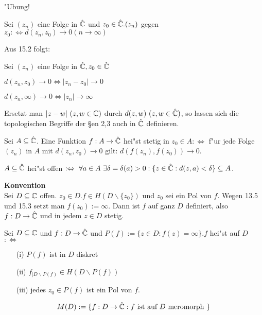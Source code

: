 \documentclass[a4paper,twoside,DIV15,BCOR12mm]{scrbook}
\begin{document}
\begin{beweis}
"Ubung!
\end{beweis}

\begin{definition}
Sei $(z_n)$ eine Folge in $\hat{\mathbb{C}}$ und $z_0 \in \hat{\mathbb{C}}. (z_n)$  gegen $z_0 :\Leftrightarrow d(z_n,z_0) \rightarrow 0 (n \rightarrow \infty)$
\end{definition}

Aus 15.2 folgt:
\begin{satz}
Sei $(z_n)$ eine Folge in $\hat{\mathbb{C}}, z_0 \in \hat{\mathbb{C}}$
\begin{liste}
\item $d(z_n,z_0) \rightarrow 0 \Leftrightarrow |z_n-z_0| \rightarrow 0$
\item $d(z_n,\infty) \rightarrow 0 \Leftrightarrow |z_n| \rightarrow \infty$
\end{liste}
\end{satz}

Ersetzt man $|z-w| \ (z,w \in \mathbb{C})$ durch $d(z,w) \ (z,w \in \hat{\mathbb{C}})$, so lassen sich die topologischen Begriffe der §en 2,3 auch in $\hat{\mathbb{C}}$ definieren.

\begin{beispiele}
\item Sei $A \subseteq \hat{\mathbb{C}}$. Eine Funktion $f: A \rightarrow \hat{\mathbb{C}}$ hei"st stetig in $z_0 \in A :\Leftrightarrow$ f"ur jede Folge $(z_n)$ in $A$ mit $d(z_n,z_0) \rightarrow 0$ gilt: $d(f(z_n),f(z_0)) \rightarrow 0$.
\item $A \subseteq \hat{\mathbb{C}}$ hei"st offen $: \Leftrightarrow \ \forall a \in A \ \exists \delta = \delta(a) > 0: \{ z \in \hat{\MdC}: d(z,a) < \delta \} \subseteq A$.
\end{beispiele}

{\bf Konvention}\\
Sei $D \subseteq \mathbb{C}$ offen. $z_0 \in D. f \in H(D \backslash\{z_0\})$ und $z_0$ sei ein  Pol von $f$. Wegen 13.5 und 15.3 setzt man $f(z_0):=\infty$. Dann ist $f$ auf ganz $D$ definiert, also $f: D \rightarrow \hat{\mathbb{C}}$ und in jedem $z \in D$ stetig.

\begin{definition}
Sei $D \subseteq \mathbb{C}$ und $f: D \rightarrow \hat{\mathbb{C}}$ und $P(f) := \{ z \in D: f(z) = \infty\}. f$ hei"st auf $D$  $:\Leftrightarrow$
\begin{itemize}
\item[(i)] $P(f)$ ist in $D$ diskret
\item[(ii)] $f_{|D \backslash P(f)} \in H( D \backslash P(f))$
\item[(iii)] jedes $z_0 \in P(f)$ ist ein Pol von $f$.
\end{itemize}
\end{definition}
\[
M(D) := \{ f: D \rightarrow \hat{\mathbb{C}}: f \mbox{ ist auf } D \mbox{ meromorph } \}
\]
\end{document}

